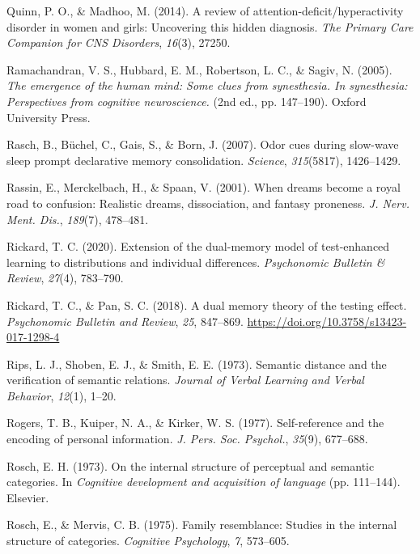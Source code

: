 \documentclass[
]{krantz}
\newlength{\cslhangindent}
\newenvironment{CSLReferences}[2] %
 {\begin{list}{}{%
  \setlength{\itemindent}{0pt}
  \setlength{\leftmargin}{0pt}
  \setlength{\parsep}{0pt}
  \ifodd #1
   \setlength{\leftmargin}{\cslhangindent}
   \setlength{\itemindent}{-1\cslhangindent}
  \fi
  \setlength{\itemsep}{#2\baselineskip}}}
 {\end{list}}
\begin{document}
\begin{CSLReferences}{1}{0}
Quinn, P. O., \& Madhoo, M. (2014). A review of attention-deficit/hyperactivity disorder in women and girls: Uncovering this hidden diagnosis. \emph{The Primary Care Companion for CNS Disorders}, \emph{16}(3), 27250.

Ramachandran, V. S., Hubbard, E. M., Robertson, L. C., \& Sagiv, N. (2005). \emph{The emergence of the human mind: Some clues from synesthesia. In synesthesia: Perspectives from cognitive neuroscience.} (2nd ed., pp. 147--190). Oxford University Press.

Rasch, B., Büchel, C., Gais, S., \& Born, J. (2007). Odor cues during slow-wave sleep prompt declarative memory consolidation. \emph{Science}, \emph{315}(5817), 1426--1429.

Rassin, E., Merckelbach, H., \& Spaan, V. (2001). When dreams become a royal road to confusion: Realistic dreams, dissociation, and fantasy proneness. \emph{J. Nerv. Ment. Dis.}, \emph{189}(7), 478--481.

Rickard, T. C. (2020). Extension of the dual-memory model of test-enhanced learning to distributions and individual differences. \emph{Psychonomic Bulletin \& Review}, \emph{27}(4), 783--790.

Rickard, T. C., \& Pan, S. C. (2018). A dual memory theory of the testing effect. \emph{Psychonomic Bulletin and Review}, \emph{25}, 847--869. \url{https://doi.org/10.3758/s13423-017-1298-4}

Rips, L. J., Shoben, E. J., \& Smith, E. E. (1973). Semantic distance and the verification of semantic relations. \emph{Journal of Verbal Learning and Verbal Behavior}, \emph{12}(1), 1--20.

Rogers, T. B., Kuiper, N. A., \& Kirker, W. S. (1977). Self-reference and the encoding of personal information. \emph{J. Pers. Soc. Psychol.}, \emph{35}(9), 677--688.

Rosch, E. H. (1973). On the internal structure of perceptual and semantic categories. In \emph{Cognitive development and acquisition of language} (pp. 111--144). Elsevier.

Rosch, E., \& Mervis, C. B. (1975). Family resemblance: Studies in the internal structure of categories. \emph{Cognitive Psychology}, \emph{7}, 573--605.


\end{CSLReferences}
\end{document}
